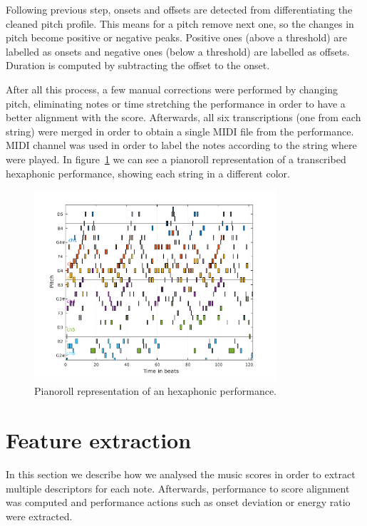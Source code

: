 Following previous step, onsets and offsets are detected from differentiating the cleaned pitch profile. This means for a pitch remove next one, so the changes in pitch become positive or negative peaks. Positive ones (above a threshold) are labelled as onsets and negative ones (below a threshold) are labelled as offsets. Duration is computed by subtracting the offset to the onset.

After all this process, a few manual corrections were performed by changing pitch, eliminating notes or time stretching the performance in order to have a better alignment with the score. Afterwards, all six transcriptions (one from each string) were merged in order to obtain a single MIDI file from the performance. MIDI channel was used in order to label the notes according to the string where were played. In figure~\ref{fig:pianoroll} we can see a pianoroll representation of a transcribed hexaphonic performance, showing each string in a different color.

\begin{figure}[ht!]
\caption{Pianoroll representation of an hexaphonic performance.}
\label{fig:pianoroll}
\centering
\includegraphics[width=0.8\textwidth]{Figures/pianoroll.pdf}
\end{figure}

\section{Feature extraction}
In this section we describe how we analysed the music scores in order to extract multiple descriptors for each note. Afterwards, performance to score alignment was computed and performance actions such as onset deviation or energy ratio were extracted.

